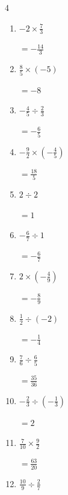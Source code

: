 \begin{multicols}{4}
\begin{enumerate}
        $\displaystyle =\frac{1}{10}$

  \item $\displaystyle -2\times{}\frac{7}{3}$

        $\displaystyle =-\frac{14}{3}$

\columnbreak %

\resetques

  \item $\displaystyle \frac{8}{5}\times{}\left(-5\right)$

        $\displaystyle =-8$

  \item $\displaystyle -\frac{4}{5}\div{}\frac{2}{3}$

        $\displaystyle =-\frac{6}{5}$

  \item $\displaystyle -\frac{9}{2}\times{}\left(-\frac{4}{5}\right)$

        $\displaystyle =\frac{18}{5}$

  \item $\displaystyle 2\div{}2$

        $\displaystyle =1$

  \item $\displaystyle -\frac{6}{7}\div{}1$

        $\displaystyle =-\frac{6}{7}$

  \item $\displaystyle 2\times{}\left(-\frac{4}{9}\right)$

        $\displaystyle =-\frac{8}{9}$

  \item $\displaystyle \frac{1}{2}\div{}\left(-2\right)$

        $\displaystyle =-\frac{1}{4}$

  \item $\displaystyle \frac{7}{6}\div{}\frac{6}{5}$

        $\displaystyle =\frac{35}{36}$

  \item $\displaystyle -\frac{2}{3}\div{}\left(-\frac{1}{3}\right)$

        $\displaystyle =2$

  \item $\displaystyle \frac{7}{10}\times{}\frac{9}{2}$

        $\displaystyle =\frac{63}{20}$

\columnbreak %

  \item $\displaystyle \frac{10}{9}\div{}\frac{2}{7}$


\end{enumerate}
\end{multicols}

